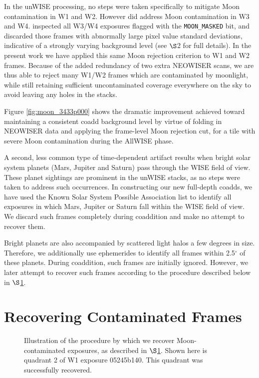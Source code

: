 \documentclass{emulateapj}
\begin{document}
In the \cite{lang14} unWISE processing, no steps were taken specifically
to mitigate Moon contamination in W1 and W2. However \cite{lang14} did 
address Moon contamination in W3 and W4. \cite{lang14}
inspected all W3/W4 exposures flagged with the \verb|MOON_MASKED| bit, and 
discarded those frames with abnormally large pixel value standard deviations,
indicative of a strongly varying background level (see \cite{lang14} $\S$2
for full details). In the present work we have applied this same
Moon rejection criterion to W1 and W2 frames. Because of the added redundancy
of two extra NEOWISER scans, we are thus able to reject many W1/W2
frames which are contaminated by moonlight, while still retaining 
sufficient uncontaminated coverage everywhere on the sky to avoid leaving
any holes in the stacks.

Figure \ref{fig:moon_3433p000} shows the dramatic improvement achieved toward 
maintaining a consistent coadd background level by virtue of folding in 
NEOWISER data and applying the frame-level Moon rejection cut, for a tile with 
severe Moon contamination during the AllWISE phase.

A second, less common type of time-dependent artifact results when
bright solar system planets (Mars, Jupiter and Saturn) pass through
the WISE field of view. These planet sightings are prominent in the 
\cite{lang14} unWISE stacks, as no steps were taken to address such
occurrences. In constructing our new full-depth coadds, we have used the Known 
Solar System Possible Association list to identify all exposures in which
Mars, Jupiter or Saturn fall within the WISE field of view. We discard
such frames completely during coaddition and make no attempt to recover them.

Bright planets are also accompanied by scattered light halos a few degrees in 
size. Therefore, we additionally use ephemerides to identify all frames within 
2.5$^{\circ}$ of these planets. During coaddition,
such frames are initially ignored. However, we later attempt to recover such
frames according to the procedure described below in $\S$\ref{sec:recover}.

\section{Recovering Contaminated Frames}
\label{sec:recover}


\begin{figure*}[ht]
 \begin{center}
  \caption{\label{fig:warp_example} Illustration of the procedure by which
           we recover Moon-contaminated exposures, as described in 
           $\S$\ref{sec:recover}. Shown here is quadrant 2
           of W1 exposure 05245b140. This quadrant was successfully recovered.}
 \end{center}
\end{figure*}
\end{document}
